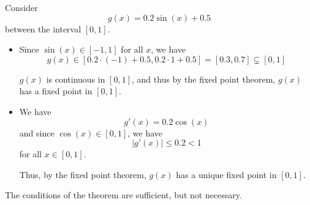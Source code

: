 \begin{example}
    Consider \[
        g(x) = 0.2 \sin(x) + 0.5
    \] between the interval \( [0, 1] \).

    \begin{figure}[H]
        \centering
    \end{figure}

    \begin{itemize}
        \item Since \( \sin(x) \in [-1, 1] \) for all \( x \), we have \[
                  g(x) \in [0.2 \cdot (-1) + 0.5, 0.2 \cdot 1 + 0.5] = [0.3, 0.7] \subsetneq [0, 1]
              \]

              \( g(x) \) is continuous in \( [0, 1] \), and thus by the fixed point theorem, \( g(x) \) has a fixed point in \( [0, 1] \).

        \item We have \[
                  g'(x) = 0.2 \cos(x)
              \] and since \( \cos(x) \in [0, 1] \), we have \[
                  | g'(x) | \leq 0.2 < 1
              \] for all \( x \in [0, 1] \).

              Thus, by the fixed point theorem, \( g(x) \) has a unique fixed point in \( [0, 1] \).
    \end{itemize}
\end{example}

\begin{remark}
    The conditions of the theorem are sufficient, but not necessary.
\end{remark}

